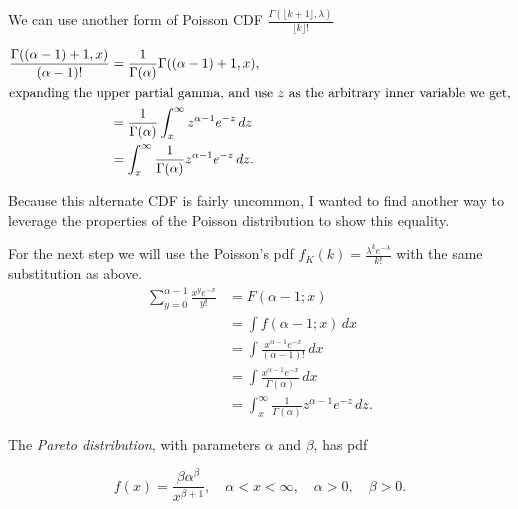 \documentclass[12pt,letterpaper]{exam}
\begin{document}
\begin{questions}
\begin{solution}
		We can use another form of Poisson CDF
		\(\frac{\Gamma(\lfloor k+1\rfloor,\lambda )}{\lfloor k\rfloor!}\)
		
		\begin{align*}
			\frac{\Gamma((\alpha-1)+1,x )}{(\alpha-1)!}
			&= \frac{1}{\Gamma(\alpha)} \Gamma((\alpha-1)+1,x ), \\
			\intertext{expanding the upper partial gamma, and use \(z\) as the arbitrary inner variable we get,}
			&= \frac{1}{\Gamma(\alpha)} \int_{x}^{\infty} z^{\alpha-1} e^{-z} \,dz \\
			&=  \int_{x}^{\infty} \frac{1}{\Gamma(\alpha)} z^{\alpha-1} e^{-z} \,dz.
		\end{align*}
		
		Because this alternate CDF is fairly uncommon, I wanted to find another way to leverage the properties of
		the Poisson distribution to show this equality.
		
		For the next step we will use the Poisson's pdf 
		\(f_K(k) = \frac{\lambda^k e^{-\lambda}}{k!} \) 
		with the same substitution as above.				
		\begin{align*}
			\sum_{y=0}^{\alpha-1} \frac{x^y e^{-x}}{y!}
			&= F(\alpha -1 ; x) \\
			&= \int f(\alpha -1 ; x) \,dx \\
			&= \int \frac{x^{\alpha-1} e^{-x}}{(\alpha-1)!} \,dx \\
			&= \int \frac{x^{\alpha-1} e^{-x}}{\Gamma(\alpha)} \,dx \\
			&= \int_{x}^{\infty} \frac{1}{\Gamma(\alpha)} z^{\alpha-1}e^{-z} \,dz.
		\end{align*}
		
		
	\end{solution}
	
	\setcounter{question}{22}
	\question 
	The \textit{Pareto distribution}, with parameters \(\alpha\) and \(\beta\), has pdf
	
	\[f(x) = \frac{\beta\alpha^\beta}{x^{\beta+1}}, \quad \alpha<x<\infty, \quad \alpha>0, \quad \beta>0.\]
	
\end{questions}
\end{document}
